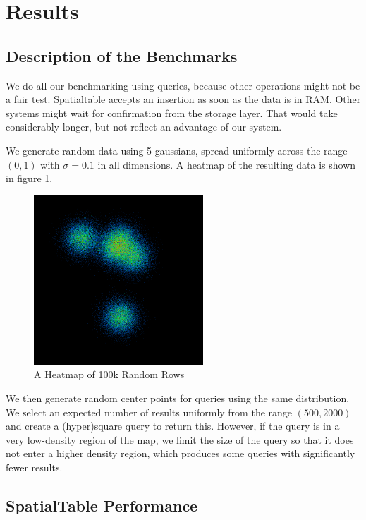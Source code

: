 \documentclass[11pt]{article}
\begin{document}
\section{Results}

\subsection{Description of the Benchmarks}

We do all our benchmarking using queries, because other operations might not be a fair test.  Spatialtable accepts an insertion as soon as the data is in RAM.  Other systems might wait for confirmation from the storage layer.  That would take considerably longer, but not reflect an advantage of our system.

We generate random data using 5 gaussians, spread uniformly across the range $(0,1)$ with $\sigma=0.1$ in all dimensions.  A heatmap of the resulting data is shown in figure \ref{fig:hm}.

\begin{figure}[h!]
\centering
\includegraphics[width=2.5in]{map100k}
\caption{A Heatmap of 100k Random Rows}
\label{fig:hm}
\end{figure}

We then generate random center points for queries using the same distribution.  We select an expected number of results uniformly from the range $(500,2000)$ and create a (hyper)square query to return this.  However, if the query is in a very low-density region of the map, we limit the size of the query so that it does not enter a higher density region, which produces  some queries with significantly fewer results.

\subsection{SpatialTable Performance}
\end{document}
